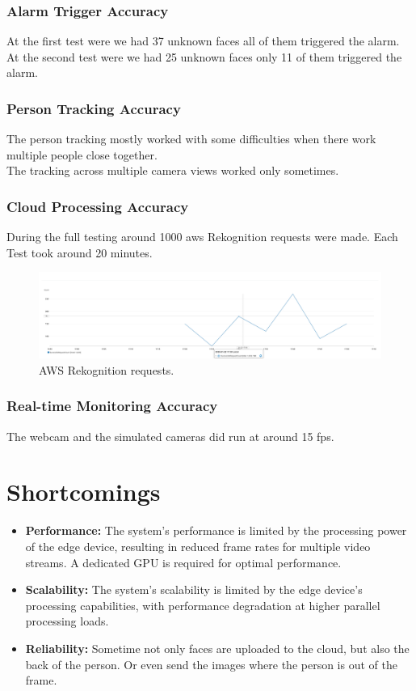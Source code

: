 \documentclass[conference]{IEEEtran}
\begin{document}
\subsubsection{Alarm Trigger Accuracy}
At the first test were we had 37 unknown faces all of them triggered the alarm.\\
At the second test were we had 25 unknown faces only 11 of them triggered the alarm.\\

\subsubsection{Person Tracking Accuracy}
The person tracking mostly worked with some difficulties when there work multiple people close together.\\
The tracking across multiple camera views worked only sometimes.

\subsubsection{Cloud Processing Accuracy}
During the full testing around 1000 aws Rekognition requests were made. Each Test took around 20 minutes.\\
\begin{figure}[ht]
      \centering
      \includegraphics[width=1\linewidth]{images/aws_rekognition.png}
      \caption{AWS Rekognition requests.}
      \label{fig:aws-rekognition}
\end{figure}

\subsubsection{Real-time Monitoring Accuracy}
The webcam and the simulated cameras did run at around 15 fps.

\section{Shortcomings}

\begin{itemize}
      \item \textbf{Performance:} The system's performance is limited by the processing power of the edge device, resulting in reduced frame rates for multiple video streams.
            A dedicated GPU is required for optimal performance.
      \item \textbf{Scalability:} The system's scalability is limited by the edge device's processing capabilities, with performance degradation at higher parallel processing loads.
      \item \textbf{Reliability:} Sometime not only faces are uploaded to the cloud, but also the back of the person. Or even send the images where the person is out of the frame.
\end{itemize}
\end{document}

